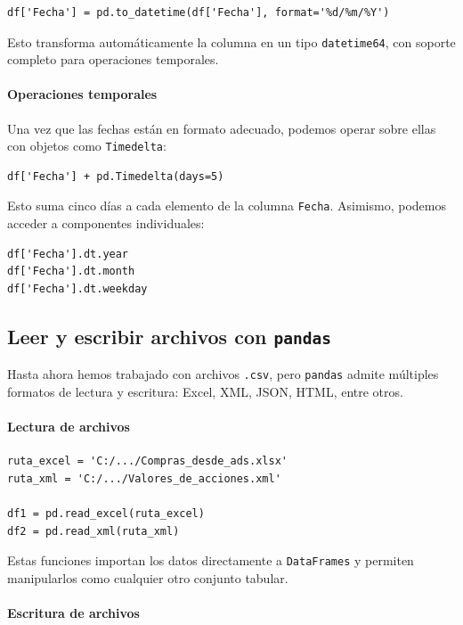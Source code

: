 \documentclass{article}
\theoremstyle{nonumberplain}
\begin{document}
\begin{verbatim}
df['Fecha'] = pd.to_datetime(df['Fecha'], format='%d/%m/%Y')
\end{verbatim}

Esto transforma automáticamente la columna en un tipo \texttt{datetime64}, con soporte completo para operaciones temporales.

\paragraph{Operaciones temporales}

Una vez que las fechas están en formato adecuado, podemos operar sobre ellas con objetos como \texttt{Timedelta}:

\begin{verbatim}
df['Fecha'] + pd.Timedelta(days=5)
\end{verbatim}

Esto suma cinco días a cada elemento de la columna \texttt{Fecha}. Asimismo, podemos acceder a componentes individuales:

\begin{verbatim}
df['Fecha'].dt.year
df['Fecha'].dt.month
df['Fecha'].dt.weekday
\end{verbatim}

\subsection*{Leer y escribir archivos con \texttt{pandas}}

Hasta ahora hemos trabajado con archivos \texttt{.csv}, pero \texttt{pandas} admite múltiples formatos de lectura y escritura: Excel, XML, JSON, HTML, entre otros.

\paragraph{Lectura de archivos}

\begin{verbatim}
ruta_excel = 'C:/.../Compras_desde_ads.xlsx'
ruta_xml = 'C:/.../Valores_de_acciones.xml'

df1 = pd.read_excel(ruta_excel)
df2 = pd.read_xml(ruta_xml)
\end{verbatim}

Estas funciones importan los datos directamente a \texttt{DataFrames} y permiten manipularlos como cualquier otro conjunto tabular.

\paragraph{Escritura de archivos}
\end{document}
